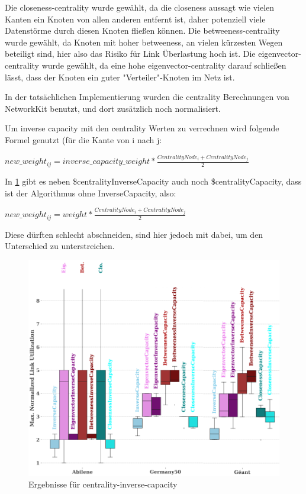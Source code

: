 \documentclass[sigconf, nonacm, review]{acmart}
\begin{document}
Die closeness-centrality wurde gewählt, da die closeness aussagt wie vielen Kanten ein Knoten von allen anderen entfernt ist, daher potenziell viele Datenstörme durch diesen Knoten fließen können.
Die betweeness-centrality wurde gewählt, da Knoten mit hoher betweeness, an vielen kürzesten Wegen beteiligt sind, hier also das Risiko für Link Überlastung hoch ist.
Die eigenvector-centrality wurde gewählt, da eine hohe eigenvector-centrality darauf schließen lässt, dass der Knoten ein guter "Verteiler"-Knoten im Netz ist.

In der tatsächlichen Implementierung wurden die centrality Berechnungen von NetworkKit benutzt, und dort zusätzlich noch normalisiert.


Um inverse capacity mit den centrality Werten zu verrechnen wird folgende Formel genutzt (für die Kante von i nach j:
\begin{center}
    $new\_weight_{ij} = inverse\_capacity\_weight * \frac{CentralityNode_i + CentralityNode_j}{2}$
\end{center}

In \ref{fig:kai_p1_results} gibt es neben \$centralityInverseCapacity auch noch \$centralityCapacity, dass ist der Algorithmus ohne InverseCapacity, also:

\begin{center}
    $new\_weight_{ij} = weight * \frac{CentralityNode_i + CentralityNode_j}{2}$
\end{center}

Diese dürften schlecht abschneiden, sind hier jedoch mit dabei, um den Unterschied zu unterstreichen.


\begin{figure}
    \centering
    \includegraphics[width=\linewidth]{figures/kai_p1_results.png}
    \caption{Ergebnisse für centrality-inverse-capacity}
    \label{fig:kai_p1_results}
\end{figure}
\end{document}
